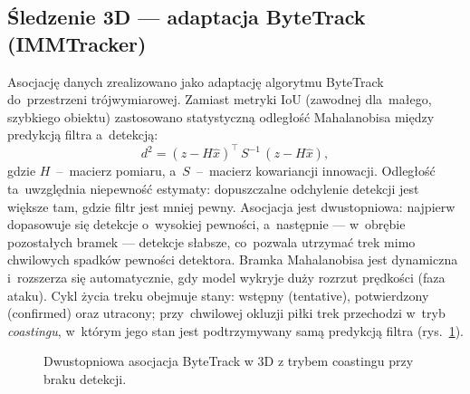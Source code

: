 \documentclass[14pt,a4paper]{extarticle}
\begin{document}
\subsection{Śledzenie 3D — adaptacja ByteTrack (IMMTracker)}
Asocjację danych zrealizowano jako adaptację algorytmu ByteTrack do~przestrzeni
trójwymiarowej. Zamiast metryki IoU (zawodnej dla~małego, szybkiego obiektu) zastosowano
statystyczną odległość Mahalanobisa między predykcją filtra a~detekcją:
\begin{equation}
d^2 = (z - H\hat{x})^{\!\top}\, S^{-1}\, (z - H\hat{x}),
\end{equation}
gdzie $H$~--~macierz pomiaru, a~$S$~--~macierz kowariancji innowacji. Odległość ta~uwzględnia
niepewność estymaty: dopuszczalne odchylenie detekcji jest większe tam, gdzie filtr jest
mniej pewny. Asocjacja jest dwustopniowa: najpierw dopasowuje się detekcje o~wysokiej
pewności, a~następnie — w~obrębie pozostałych bramek — detekcje słabsze, co~pozwala
utrzymać trek mimo chwilowych spadków pewności detektora. Bramka Mahalanobisa jest
dynamiczna i~rozszerza się automatycznie, gdy model wykryje duży rozrzut prędkości (faza
ataku). Cykl życia treku obejmuje stany: wstępny (tentative), potwierdzony (confirmed)
oraz utracony; przy~chwilowej okluzji piłki trek przechodzi w~tryb \emph{coastingu},
w~którym jego stan jest podtrzymywany samą predykcją filtra (rys.~\ref{fig:bytetrack}).

\begin{figure}[H]
\centering
{}
\caption{Dwustopniowa asocjacja ByteTrack w 3D z trybem coastingu przy braku detekcji.}
\label{fig:bytetrack}
\end{figure}
\end{document}
